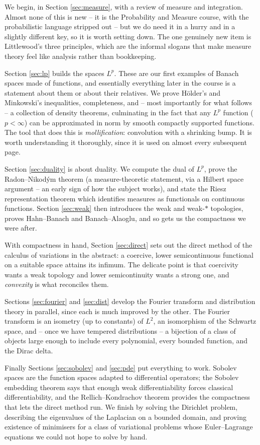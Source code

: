 \documentclass[a4paper]{scrartcl}
\begin{document}
We begin, in Section \ref{sec:measure}, with a review of measure and integration. Almost none of this is new -- it is the Probability and Measure course, with the probabilistic language stripped out -- but we do need it in a hurry and in a slightly different key, so it is worth setting down. The one genuinely new item is Littlewood's three principles, which are the informal slogans that make measure theory feel like analysis rather than bookkeeping.

Section \ref{sec:lp} builds the spaces $L^p$. These are our first examples of Banach spaces made of functions, and essentially everything later in the course is a statement about them or about their relatives. We prove H\"older's and Minkowski's inequalities, completeness, and -- most importantly for what follows -- a collection of density theorems, culminating in the fact that any $L^p$ function ($p < \infty$) can be approximated in norm by smooth compactly supported functions. The tool that does this is \emph{mollification}: convolution with a shrinking bump. It is worth understanding it thoroughly, since it is used on almost every subsequent page.

Section \ref{sec:duality} is about duality. We compute the dual of $L^p$, prove the Radon--Nikod\'ym theorem (a measure-theoretic statement, via a Hilbert space argument -- an early sign of how the subject works), and state the Riesz representation theorem which identifies measures as functionals on continuous functions. Section \ref{sec:weak} then introduces the weak and weak-$*$ topologies, proves Hahn--Banach and Banach--Alaoglu, and so gets us the compactness we were after.

With compactness in hand, Section \ref{sec:direct} sets out the direct method of the calculus of variations in the abstract: a coercive, lower semicontinuous functional on a suitable space attains its infimum. The delicate point is that coercivity wants a weak topology and lower semicontinuity wants a strong one, and \emph{convexity} is what reconciles them.

Sections \ref{sec:fourier} and \ref{sec:dist} develop the Fourier transform and distribution theory in parallel, since each is much improved by the other. The Fourier transform is an isometry (up to constants) of $L^2$, an isomorphism of the Schwartz space, and -- once we have tempered distributions -- a bijection of a class of objects large enough to include every polynomial, every bounded function, and the Dirac delta.

Finally Sections \ref{sec:sobolev} and \ref{sec:pde} put everything to work. Sobolev spaces are the function spaces adapted to differential operators; the Sobolev embedding theorem says that enough weak differentiability forces classical differentiability, and the Rellich--Kondrachov theorem provides the compactness that lets the direct method run. We finish by solving the Dirichlet problem, describing the eigenvalues of the Laplacian on a bounded domain, and proving existence of minimisers for a class of variational problems whose Euler--Lagrange equations we could not hope to solve by hand.
\end{document}
